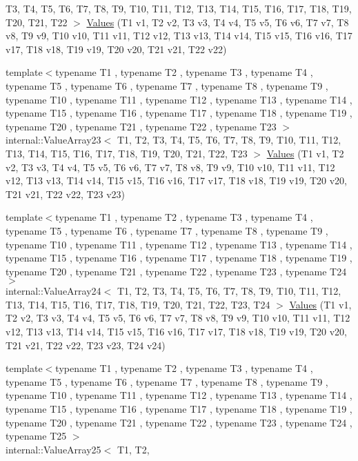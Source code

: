 \begin{DoxyCompactItemize}
\-T3, \-T4, \-T5, \-T6, \-T7, \-T8, \-T9, \*
\-T10, \-T11, \-T12, \-T13, \-T14, \-T15, \*
\-T16, \-T17, \-T18, \-T19, \-T20, \-T21, \*
\-T22 $>$ \hyperlink{namespacetesting_aadfff0d803156b98ff1ffa5f1d95c350}{\-Values} (\-T1 v1, \-T2 v2, \-T3 v3, \-T4 v4, \-T5 v5, \-T6 v6, \-T7 v7, \-T8 v8, \-T9 v9, \-T10 v10, \-T11 v11, \-T12 v12, \-T13 v13, \-T14 v14, \-T15 v15, \-T16 v16, \-T17 v17, \-T18 v18, \-T19 v19, \-T20 v20, \-T21 v21, \-T22 v22)
\item 
{\footnotesize template$<$typename T1 , typename T2 , typename T3 , typename T4 , typename T5 , typename T6 , typename T7 , typename T8 , typename T9 , typename T10 , typename T11 , typename T12 , typename T13 , typename T14 , typename T15 , typename T16 , typename T17 , typename T18 , typename T19 , typename T20 , typename T21 , typename T22 , typename T23 $>$ }\\internal\-::\-Value\-Array23$<$ \-T1, \-T2, \*
\-T3, \-T4, \-T5, \-T6, \-T7, \-T8, \-T9, \*
\-T10, \-T11, \-T12, \-T13, \-T14, \-T15, \*
\-T16, \-T17, \-T18, \-T19, \-T20, \-T21, \*
\-T22, \-T23 $>$ \hyperlink{namespacetesting_a820991f1c28518a0c218176bd7192de8}{\-Values} (\-T1 v1, \-T2 v2, \-T3 v3, \-T4 v4, \-T5 v5, \-T6 v6, \-T7 v7, \-T8 v8, \-T9 v9, \-T10 v10, \-T11 v11, \-T12 v12, \-T13 v13, \-T14 v14, \-T15 v15, \-T16 v16, \-T17 v17, \-T18 v18, \-T19 v19, \-T20 v20, \-T21 v21, \-T22 v22, \-T23 v23)
\item 
{\footnotesize template$<$typename T1 , typename T2 , typename T3 , typename T4 , typename T5 , typename T6 , typename T7 , typename T8 , typename T9 , typename T10 , typename T11 , typename T12 , typename T13 , typename T14 , typename T15 , typename T16 , typename T17 , typename T18 , typename T19 , typename T20 , typename T21 , typename T22 , typename T23 , typename T24 $>$ }\\internal\-::\-Value\-Array24$<$ \-T1, \-T2, \*
\-T3, \-T4, \-T5, \-T6, \-T7, \-T8, \-T9, \*
\-T10, \-T11, \-T12, \-T13, \-T14, \-T15, \*
\-T16, \-T17, \-T18, \-T19, \-T20, \-T21, \*
\-T22, \-T23, \-T24 $>$ \hyperlink{namespacetesting_a74b2375fe8c3c685e6f7b0b6a9b61009}{\-Values} (\-T1 v1, \-T2 v2, \-T3 v3, \-T4 v4, \-T5 v5, \-T6 v6, \-T7 v7, \-T8 v8, \-T9 v9, \-T10 v10, \-T11 v11, \-T12 v12, \-T13 v13, \-T14 v14, \-T15 v15, \-T16 v16, \-T17 v17, \-T18 v18, \-T19 v19, \-T20 v20, \-T21 v21, \-T22 v22, \-T23 v23, \-T24 v24)
\item 
{\footnotesize template$<$typename T1 , typename T2 , typename T3 , typename T4 , typename T5 , typename T6 , typename T7 , typename T8 , typename T9 , typename T10 , typename T11 , typename T12 , typename T13 , typename T14 , typename T15 , typename T16 , typename T17 , typename T18 , typename T19 , typename T20 , typename T21 , typename T22 , typename T23 , typename T24 , typename T25 $>$ }\\internal\-::\-Value\-Array25$<$ \-T1, \-T2, \*

\end{DoxyCompactItemize}
